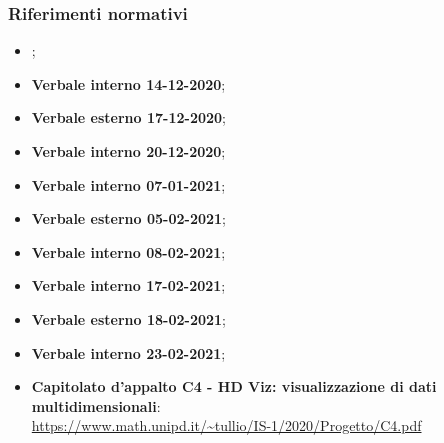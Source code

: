 \subsubsection{Riferimenti normativi}
\begin{itemize}
	\item \textbf{};
	\item \textbf{Verbale interno 14-12-2020};
	\item \textbf{Verbale esterno 17-12-2020};
	\item \textbf{Verbale interno 20-12-2020};
	\item \textbf{Verbale interno 07-01-2021};
	\item \textbf{Verbale esterno 05-02-2021};
	\item \textbf{Verbale interno 08-02-2021};
	\item \textbf{Verbale interno 17-02-2021};
	\item \textbf{Verbale esterno 18-02-2021};
	\item \textbf{Verbale interno 23-02-2021};
	\item \textbf{Capitolato d'appalto C4 - HD Viz: visualizzazione di dati multidimensionali}:\\
	\textcolor{blue}{\url{https://www.math.unipd.it/~tullio/IS-1/2020/Progetto/C4.pdf}}
\end{itemize}

